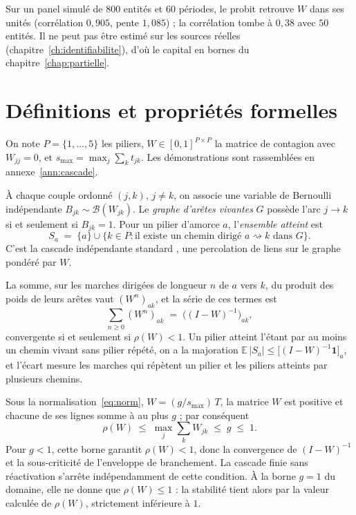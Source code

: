 Sur un panel simulé de
$800$ entités et $60$ périodes, le probit retrouve $W$ dans ses unités (corrélation $0{,}905$, pente
$1{,}085$) ; la corrélation tombe à $0{,}38$ avec $50$ entités. Il ne peut pas être estimé sur les
sources réelles (chapitre~\ref{ch:identifiabilite}), d'où le capital en bornes du chapitre~\ref{chap:partielle}.


\section{Définitions et propriétés formelles}
\label{sec:formalisation}

On note
$P=\{1,\dots,5\}$ les piliers, $W\in[0,1]^{P\times P}$ la matrice de contagion avec
$W_{jj}=0$, et $s_{\max}=\max_j\sum_k t_{jk}$. Les démonstrations sont
rassemblées en annexe~\ref{ann:cascade}.

\begin{definition}
\label{def:cascade}
À chaque couple ordonné $(j,k)$, $j\neq k$, on associe une variable de Bernoulli
indépendante $B_{jk}\sim\mathcal B(W_{jk})$. Le \emph{graphe d'arêtes vivantes} $G$ possède
l'arc $j\to k$ si et seulement si $B_{jk}=1$. Pour un pilier d'amorce $a$, l'\emph{ensemble
atteint} est
\[
  S_a \;=\; \{a\}\cup\{k\in P : \text{il existe un chemin dirigé } a\rightsquigarrow k \text{ dans } G\}.
\]
C'est la cascade indépendante standard \citep{kempe2003}, une percolation de liens sur le graphe pondéré par $W$.
\end{definition}

\begin{proposition}
\label{prop:reduite}
La somme, sur les marches dirigées de longueur $n$ de $a$ vers $k$, du produit des poids de
leurs arêtes vaut $(W^n)_{ak}$, et la série de ces termes est
\[
  \sum_{n\ge 0}(W^n)_{ak} \;=\; \bigl((I-W)^{-1}\bigr)_{ak},
\]
convergente si et seulement si $\rho(W)<1$. Un pilier atteint l'étant par au moins un chemin vivant
sans pilier répété, on a la majoration $\mathbb E\,|S_a|\le \bigl[(I-W)^{-1}\mathbf 1\bigr]_a$, et
l'écart mesure les marches qui répètent un pilier et les piliers atteints par plusieurs chemins.
\end{proposition}

\begin{proposition}
\label{prop:leontief}
Sous la normalisation~\eqref{eq:norm}, $W=(g/s_{\max})\,T$, la matrice $W$ est
positive et chacune de ses lignes somme à au plus $g$ ; par conséquent
\[
  \rho(W)\;\le\;\max_j\sum_k W_{jk}\;\le\;g\;\le\;1 .
\]
Pour $g<1$, cette borne garantit $\rho(W)<1$, donc la convergence de $(I-W)^{-1}$ et la sous-criticité de l'enveloppe de branchement. La cascade finie sans réactivation s'arrête indépendamment de cette condition. À la borne $g=1$ du domaine, elle ne donne que $\rho(W)\le 1$ : la stabilité tient
alors par la valeur calculée de $\rho(W)$, strictement inférieure à $1$.
\end{proposition}

